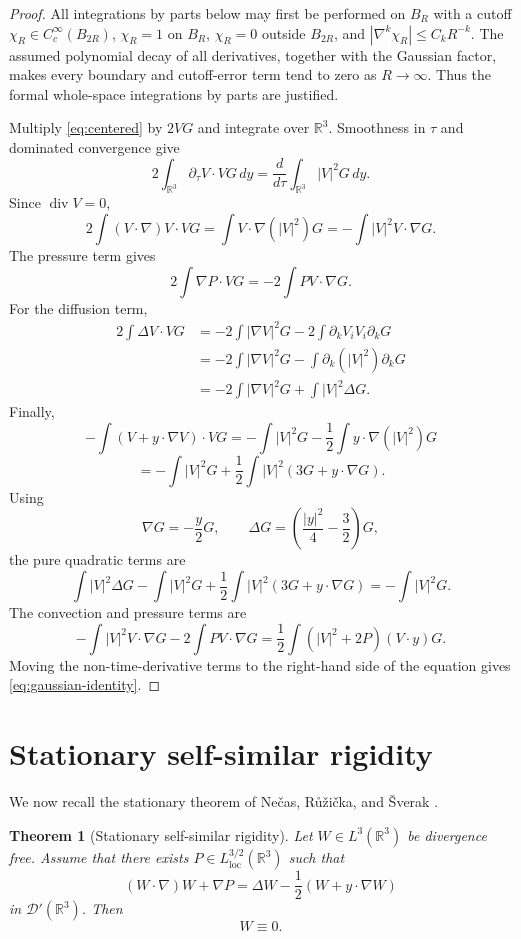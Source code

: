 \documentclass[11pt]{amsart}
\theoremstyle{plain}
\newtheorem{theorem}{Theorem}[section]
\theoremstyle{definition}
\theoremstyle{remark}
\numberwithin{equation}{section}
\begin{document}
\begin{proof}
All integrations by parts below may first be performed on \(B_R\) with a
cutoff \(\chi_R\in C_c^\infty(B_{2R})\), \(\chi_R=1\) on \(B_R\), \(\chi_R=0\) outside
\(B_{2R}\), and \(|\nabla^k\chi_R|\le C_kR^{-k}\).  The assumed polynomial
decay of all derivatives, together with the Gaussian factor, makes every
boundary and cutoff-error term tend to zero as \(R\to\infty\).  Thus the
formal whole-space integrations by parts are justified.

Multiply \eqref{eq:centered} by \(2VG\) and integrate over \(\mathbb R^3\).
Smoothness in \(\tau\) and dominated convergence give
\[
   2\int_{\mathbb R^3}\partial_\tau V\cdot VG\,dy
   =
   \frac{d}{d\tau}\int_{\mathbb R^3}|V|^2G\,dy .
\]
Since \(\operatorname{div} V=0\),
\[
   2\int (V\cdot\nabla)V\cdot VG
   =
   \int V\cdot\nabla(|V|^2)G
   =
   -\int |V|^2 V\cdot\nabla G.
\]
The pressure term gives
\[
   2\int \nabla P\cdot VG
   =
   -2\int P V\cdot\nabla G.
\]
For the diffusion term,
\[
\begin{aligned}
   2\int \Delta V\cdot VG
   &=
   -2\int|\nabla V|^2G
   -2\int \partial_kV_iV_i\partial_kG  \\
   &=
   -2\int|\nabla V|^2G
   -\int \partial_k(|V|^2)\partial_kG  \\
   &=
   -2\int|\nabla V|^2G
   +\int |V|^2\Delta G.
\end{aligned}
\]
Finally,
\[
   -\int (V+y\cdot\nabla V)\cdot VG
   =
   -\int |V|^2G-\frac12\int y\cdot\nabla(|V|^2)G
\]
\[
   =
   -\int |V|^2G
   +\frac12\int |V|^2(3G+y\cdot\nabla G).
\]
Using
\[
   \nabla G=-\frac y2G,\qquad
   \Delta G=\left(\frac{|y|^2}{4}-\frac32\right)G,
\]
the pure quadratic terms are
\[
   \int |V|^2\Delta G
   -\int |V|^2G
   +\frac12\int |V|^2(3G+y\cdot\nabla G)
   =
   -\int |V|^2G.
\]
The convection and pressure terms are
\[
   -\int |V|^2 V\cdot\nabla G
   -2\int P V\cdot\nabla G
   =
   \frac12\int (|V|^2+2P)(V\cdot y)G .
\]
Moving the non-time-derivative terms to the right-hand side of the equation
gives \eqref{eq:gaussian-identity}.
\end{proof}

\section{Stationary self-similar rigidity}

We now recall the stationary theorem of
Ne\v{c}as, R\r{u}\v{z}i\v{c}ka, and \v{S}verak
\cite{NRS1996}.

\begin{theorem}[Stationary self-similar rigidity]\label{thm:NRS}
Let \(W\in L^3(\mathbb R^3)\) be divergence free.  Assume that there exists
\(P\in L^{3/2}_{\mathrm{loc}}(\mathbb R^3)\) such that
\begin{equation}\label{eq:stationary-profile}
   (W\cdot\nabla)W+\nabla P
   =
   \Delta W-\frac12(W+y\cdot\nabla W)
\end{equation}
in \(\mathcal D'(\mathbb R^3)\).  Then
\[
   W\equiv0.
\]
\end{theorem}
\end{document}
